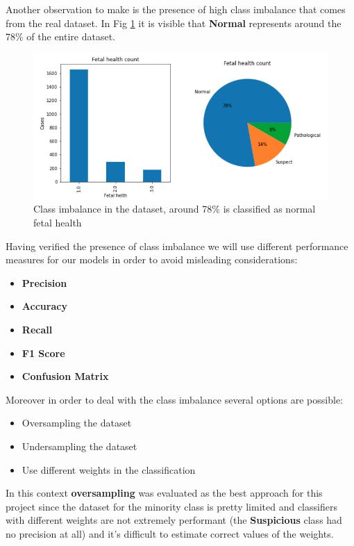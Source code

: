 \documentclass[a4paper,12pt]{article}
\begin{document}
\noindent Another observation to make is the presence of high class imbalance that comes from the real dataset. In Fig \ref{fig:imbalance} it is visible that \textbf{Normal} represents around the 78\% of the entire dataset.

\begin{figure}[H]
\begin{center}
\includegraphics[width=1.0\textwidth]{images/imbalance.png}
\end{center}
\caption{Class imbalance in the dataset, around 78\% is classified as normal fetal health}
\label{fig:imbalance}
\end{figure}

\noindent Having verified the presence of class imbalance we will use different performance measures for our models in order to avoid misleading considerations:
\bigbreak
\begin{itemize}
  \item \textbf{Precision}
  \item \textbf{Accuracy} 
  \item \textbf{Recall}
  \item \textbf{F1 Score}
  \item \textbf{Confusion Matrix}
\end{itemize}

\bigbreak
\noindent
Moreover in order to deal with the class imbalance several options are possible:
\begin{itemize}
  \item Oversampling the dataset 
  \item Undersampling the dataset
  \item Use different weights in the classification
\end{itemize}
\bigbreak
\noindent In this context \textbf{oversampling} was evaluated as the best approach for this project since the dataset for the minority class is pretty limited and classifiers with different weights are not extremely performant (the \textbf{Suspicious} class had no precision at all) and it's difficult to estimate correct values of the weights.
\end{document}
